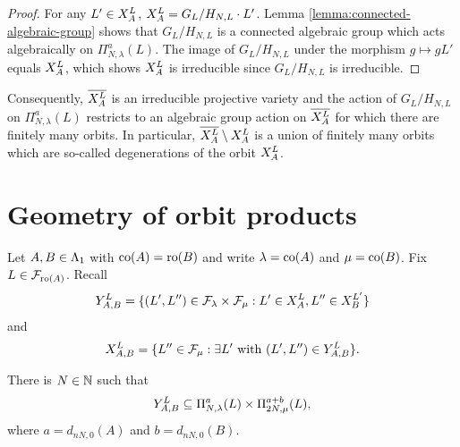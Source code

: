 \documentclass[a4paper, 11pt, twoside]{report}
\begin{document}
\begin{proof}
For any $L'\in\xprod[L]{A}$, $\xprod[L]{A} = G_L/{H_{N,L}}\cdot L'$. Lemma \ref{lemma:connected-algebraic-group} shows that $G_L/{H_{N,L}}$ is a connected algebraic group which acts algebraically on $\Pi_{N,\lambda}^a(L)$. The image of $G_L/{H_{N,L}}$ under the morphism $g\mapsto gL'$ equals $\xprod[L]{A}$, which shows $\xprod[L]{A}$ is irreducible since $G_L/{H_{N,L}}$ is irreducible.
\end{proof}

Consequently, $\overline{\xprod[L]{A}}$ is an irreducible projective variety and the action of $G_L/{H_{N,L}}$ on $\Pi_{N,\lambda}^a(L)$ restricts to an algebraic group action on $\overline{\xprod[L]{A}}$ for which there are finitely many orbits. In particular, $\overline{\xprod[L]{A}}\setminus\xprod[L]{A}$ is a union of finitely many orbits which are so-called degenerations of the orbit $\xprod[L]{A}$.


\section{Geometry of orbit products}

Let $A,B\in\matrices$ with $\co{A}=\ro{B}$ and write $\lambda=\co{A}$ and $\mu=\co{B}$. Fix $L\in\flags_{\ro{A}}$. Recall
\begin{equation*}
\yprod[L]{A,B}=\{(L',L'')\in\flags_{\lambda}\times\flags_{\mu}: L'\in\xprod[L]{A}, L''\in\xprod[L']{B}\}
\end{equation*}
and
\begin{equation*}
\xprod[L]{A,B}=\{L''\in\flags_{\mu}: \exists L' \text{ with } (L',L'')\in\yprod[L]{A,B}\}.
\end{equation*}

\begin{lemma}\label{lemma:embedding-orbit-products}
There is $N\in\naturals$ such that
\begin{equation*}
\yprod[L]{A,B}\subset\Pi_{N,\lambda}^a(L)\times\Pi_{2N,\mu}^{a+b}(L),
\end{equation*}
where $a=d_{nN,0}{(A)}$ and $b=d_{nN,0}{(B)}$.
\end{lemma}
\end{document}
